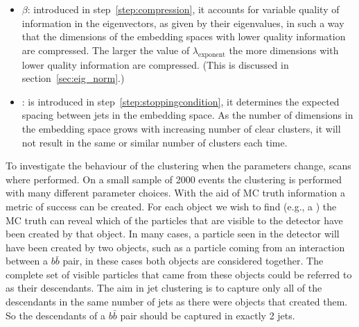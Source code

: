 \begin{itemize}
       \item  \(\beta\): introduced in step~\ref{step:compression}, it 
          accounts for variable quality of information in the eigenvectors, as given by their eigenvalues,
        in such a way that the dimensions of the embedding spaces with lower quality information are compressed.
        The larger the value of \(\lambda_\text{exponent}\) the more dimensions with lower quality information are compressed.
        (This is discussed in section~\ref{sec:eig_norm}.)
    \item \stoppingdeltar{}: is introduced in step~\ref{step:stoppingcondition}, it
         determines the expected spacing between jets in the embedding space.
         As the number of dimensions in the embedding space grows with increasing 
         number of clear clusters, it will not result in the same or
         similar number of clusters each time.

\end{itemize}



To investigate the behaviour of the clustering when the parameters change, scans where performed.
On a small sample of 2000 events  the clustering is performed with many different parameter choices.
%
With the aid of MC truth information a metric of success can be created.
For each object we wish to find (e.g., a ) 
the MC truth can reveal which of the particles that are visible to the detector have
been created by that object.
In many cases, a particle seen in the detector will have been created by two objects,
such as a particle coming from an interaction between a \(b\bar{b}\) pair,
in these cases both objects are considered together.
The complete set of visible particles that came from these objects could be referred to as their descendants.
The aim in jet clustering is to capture only all of the descendants in the same number of jets as there were objects that created them.
So the descendants of a \(b\bar{b}\) pair should be captured in exactly 2 jets.

